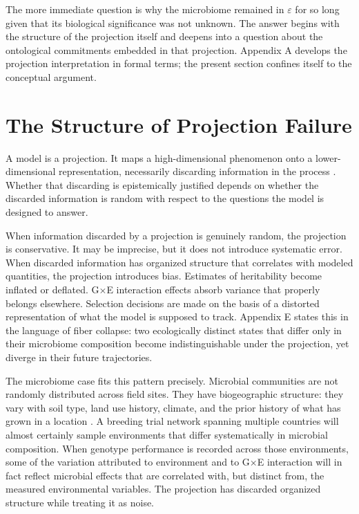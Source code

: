 \documentclass[11pt, a4paper]{article}
\begin{document}
The more immediate question is why the microbiome remained in $\varepsilon$ for so long given that its biological significance was not unknown. The answer begins with the structure of the projection itself and deepens into a question about the ontological commitments embedded in that projection. Appendix A develops the projection interpretation in formal terms; the present section confines itself to the conceptual argument.

\section{The Structure of Projection Failure}

A model is a projection. It maps a high-dimensional phenomenon onto a lower-dimensional representation, necessarily discarding information in the process \citep{box1976}. Whether that discarding is epistemically justified depends on whether the discarded information is random with respect to the questions the model is designed to answer.

When information discarded by a projection is genuinely random, the projection is conservative. It may be imprecise, but it does not introduce systematic error. When discarded information has organized structure that correlates with modeled quantities, the projection introduces bias. Estimates of heritability become inflated or deflated. G$\times$E interaction effects absorb variance that properly belongs elsewhere. Selection decisions are made on the basis of a distorted representation of what the model is supposed to track. Appendix E states this in the language of fiber collapse: two ecologically distinct states that differ only in their microbiome composition become indistinguishable under the projection, yet diverge in their future trajectories.

The microbiome case fits this pattern precisely. Microbial communities are not randomly distributed across field sites. They have biogeographic structure: they vary with soil type, land use history, climate, and the prior history of what has grown in a location \citep{revillini2019}. A breeding trial network spanning multiple countries will almost certainly sample environments that differ systematically in microbial composition. When genotype performance is recorded across those environments, some of the variation attributed to environment and to G$\times$E interaction will in fact reflect microbial effects that are correlated with, but distinct from, the measured environmental variables. The projection has discarded organized structure while treating it as noise.
\end{document}
